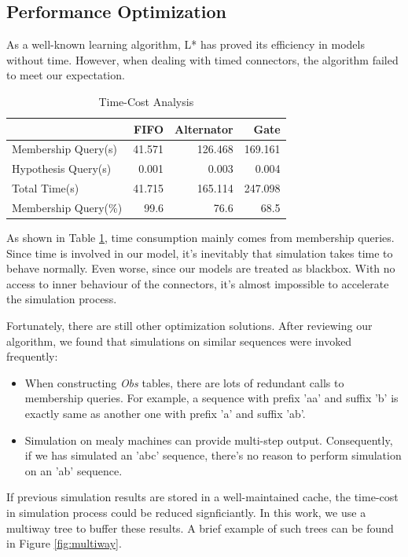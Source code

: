 \documentclass[conference, a4paper]{IEEEtran}
\begin{document}
\subsection{Performance Optimization}
As a well-known learning algorithm, L* has proved its efficiency in models without time.
However, when dealing with timed connectors, the algorithm failed to meet our expectation.

\begin{table}[h]
  \renewcommand{\arraystretch}{1.3}
  \caption{Time-Cost Analysis}
  \label{tabel:timecost}
  \centering
  \begin{tabular}{l||rrr}
    \hline
    & FIFO & Alternator & Gate \\
    \hline\hline
    Membership Query(s) & 41.571 & 126.468 & 169.161 \\
    Hypothesis Query(s) & 0.001 & 0.003 & 0.004 \\
    Total Time(s) & 41.715 & 165.114 & 247.098\\
    Membership Query(\%) & 99.6 & 76.6 & 68.5\\
    \hline
  \end{tabular}
\end{table}

As shown in Table \ref{tabel:timecost}, time consumption mainly comes from membership queries.
Since time is involved in our model, it's inevitably that simulation takes time to behave normally.
Even worse, since our models are treated as blackbox. With no access to inner behaviour of the
connectors, it's almost impossible to accelerate the simulation process.

Fortunately, there are still other optimization solutions. After reviewing our algorithm, we found
that simulations on similar sequences were invoked frequently:

\begin{itemize}
  \item When constructing \emph{Obs} tables, there are lots of redundant calls to membership
    queries. For example, a sequence with prefix 'aa' and suffix 'b' is exactly same as another one
    with prefix 'a' and suffix 'ab'.
  \item Simulation on mealy machines can provide multi-step output. Consequently, if we has
    simulated an 'abc' sequence, there's no reason to perform simulation on an 'ab' sequence.
\end{itemize}

If previous simulation results are stored in a well-maintained cache, the time-cost in
simulation process could be reduced signficiantly. In this work, we use a multiway tree to buffer
these results. A brief example of such trees can be found in Figure \ref{fig:multiway}.
\end{document}

